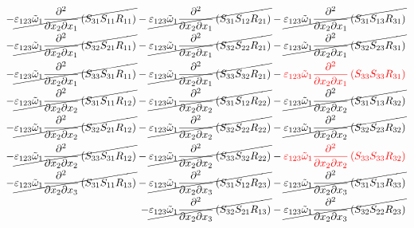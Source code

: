 \begin{equation}
	\begin{split}
		-\cancel{\varepsilon_{123}\tilde{\omega}_{1}\pdv{}{x_{2}}{x_{1}}\left(S_{31}S_{11}R_{11}\right)}
		-\cancel{\varepsilon_{123}\tilde{\omega}_{1}\pdv{}{x_{2}}{x_{1}}\left(S_{31}S_{12}R_{21}\right)}
		-\cancel{\varepsilon_{123}\tilde{\omega}_{1}\pdv{}{x_{2}}{x_{1}}\left(S_{31}S_{13}R_{31}\right)}\\
		-\cancel{\varepsilon_{123}\tilde{\omega}_{1}\pdv{}{x_{2}}{x_{1}}\left(S_{32}S_{21}R_{11}\right)}
		-\cancel{\varepsilon_{123}\tilde{\omega}_{1}\pdv{}{x_{2}}{x_{1}}\left(S_{32}S_{22}R_{21}\right)}
		-\cancel{\varepsilon_{123}\tilde{\omega}_{1}\pdv{}{x_{2}}{x_{1}}\left(S_{32}S_{23}R_{31}\right)}\\
		-\cancel{\varepsilon_{123}\tilde{\omega}_{1}\pdv{}{x_{2}}{x_{1}}\left(S_{33}S_{31}R_{11}\right)}
		-\cancel{\varepsilon_{123}\tilde{\omega}_{1}\pdv{}{x_{2}}{x_{1}}\left(S_{33}S_{32}R_{21}\right)}
		-{\color{red}\varepsilon_{123}\tilde{\omega}_{1}\pdv{}{x_{2}}{x_{1}}\left(S_{33}S_{33}R_{31}\right)}\\
		-\cancel{\varepsilon_{123}\tilde{\omega}_{1}\pdv{}{x_{2}}{x_{2}}\left(S_{31}S_{11}R_{12}\right)}
		-\cancel{\varepsilon_{123}\tilde{\omega}_{1}\pdv{}{x_{2}}{x_{2}}\left(S_{31}S_{12}R_{22}\right)}
		-\cancel{\varepsilon_{123}\tilde{\omega}_{1}\pdv{}{x_{2}}{x_{2}}\left(S_{31}S_{13}R_{32}\right)}\\
		-\cancel{\varepsilon_{123}\tilde{\omega}_{1}\pdv{}{x_{2}}{x_{2}}\left(S_{32}S_{21}R_{12}\right)}
		-\cancel{\varepsilon_{123}\tilde{\omega}_{1}\pdv{}{x_{2}}{x_{2}}\left(S_{32}S_{22}R_{22}\right)}
		-\cancel{\varepsilon_{123}\tilde{\omega}_{1}\pdv{}{x_{2}}{x_{2}}\left(S_{32}S_{23}R_{32}\right)}\\
		-\cancel{\varepsilon_{123}\tilde{\omega}_{1}\pdv{}{x_{2}}{x_{2}}\left(S_{33}S_{31}R_{12}\right)}
		-\cancel{\varepsilon_{123}\tilde{\omega}_{1}\pdv{}{x_{2}}{x_{2}}\left(S_{33}S_{32}R_{22}\right)}
		-{\color{red}\varepsilon_{123}\tilde{\omega}_{1}\pdv{}{x_{2}}{x_{2}}\left(S_{33}S_{33}R_{32}\right)}\\
		-\cancel{\varepsilon_{123}\tilde{\omega}_{1}\pdv{}{x_{2}}{x_{3}}\left(S_{31}S_{11}R_{13}\right)}
		-\cancel{\varepsilon_{123}\tilde{\omega}_{1}\pdv{}{x_{2}}{x_{3}}\left(S_{31}S_{12}R_{23}\right)}
		-\cancel{\varepsilon_{123}\tilde{\omega}_{1}\pdv{}{x_{2}}{x_{3}}\left(S_{31}S_{13}R_{33}\right)}\\
		-\cancel{\varepsilon_{123}\tilde{\omega}_{1}\pdv{}{x_{2}}{x_{3}}\left(S_{32}S_{21}R_{13}\right)}
		-\cancel{\varepsilon_{123}\tilde{\omega}_{1}\pdv{}{x_{2}}{x_{3}}\left(S_{32}S_{22}R_{23}\right)}

\end{split}
\end{equation}

